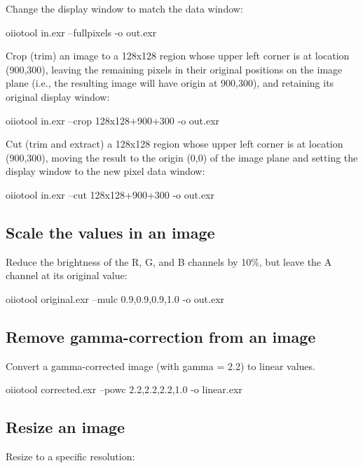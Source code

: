 \noindent Change the display window to match the data window:
\begin{code}
    oiiotool in.exr --fullpixels -o out.exr
\end{code}

\noindent Crop (trim) an image to a 128x128 region whose upper left corner
is at location (900,300), leaving the remaining pixels in their original
positions on the image plane (i.e., the resulting image will have origin at
900,300), and retaining its original display window:
\begin{code}
    oiiotool in.exr --crop 128x128+900+300 -o out.exr
\end{code}

\noindent Cut (trim and extract) a 128x128 region whose upper left corner
is at location (900,300), moving the result to the origin (0,0) of the image
plane and setting the display window to the new pixel data window:
\begin{code}
    oiiotool in.exr --cut 128x128+900+300 -o out.exr
\end{code}


\subsection*{Scale the values in an image}

Reduce the brightness of the R, G, and B channels by 10\%,
but leave the A channel at its original value:

\begin{code}
    oiiotool original.exr --mulc 0.9,0.9,0.9,1.0 -o out.exr
\end{code}

\subsection*{Remove gamma-correction from an image}

Convert a gamma-corrected image (with gamma = 2.2) to linear values.

\begin{code}
    oiiotool corrected.exr --powc 2.2,2.2,2.2,1.0 -o linear.exr
\end{code}

\subsection*{Resize an image}

\noindent Resize to a specific resolution:

